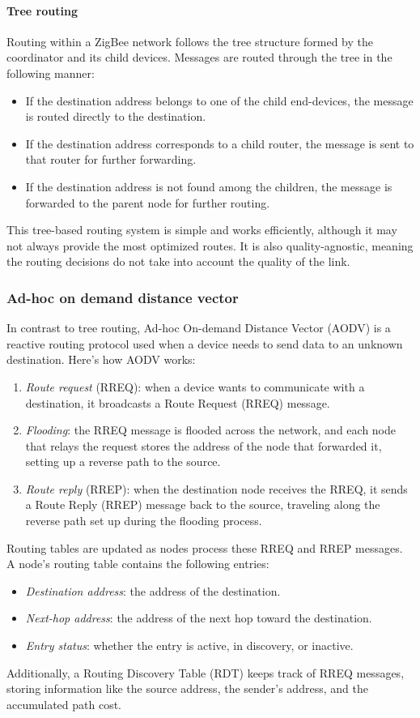 \paragraph*{Tree routing}
Routing within a ZigBee network follows the tree structure formed by the coordinator and its child devices. 
Messages are routed through the tree in the following manner:
\begin{itemize}
    \item If the destination address belongs to one of the child end-devices, the message is routed directly to the destination.
    \item If the destination address corresponds to a child router, the message is sent to that router for further forwarding.
    \item If the destination address is not found among the children, the message is forwarded to the parent node for further routing.
\end{itemize}
This tree-based routing system is simple and works efficiently, although it may not always provide the most optimized routes. 
It is also quality-agnostic, meaning the routing decisions do not take into account the quality of the link.

\subsubsection{Ad-hoc on demand distance vector}
In contrast to tree routing, Ad-hoc On-demand Distance Vector (AODV) is a reactive routing protocol used when a device needs to send data to an unknown destination. 
Here's how AODV works:
\begin{enumerate}
    \item \textit{Route request} (RREQ): when a device wants to communicate with a destination, it broadcasts a Route Request (RREQ) message.
    \item \textit{Flooding}: the RREQ message is flooded across the network, and each node that relays the request stores the address of the node that forwarded it, setting up a reverse path to the source.
    \item \textit{Route reply} (RREP): when the destination node receives the RREQ, it sends a Route Reply (RREP) message back to the source, traveling along the reverse path set up during the flooding process.
\end{enumerate}
\noindent Routing tables are updated as nodes process these RREQ and RREP messages. 
A node's routing table contains the following entries:
\begin{itemize}
    \item \textit{Destination address}: the address of the destination.
    \item \textit{Next-hop address}: the address of the next hop toward the destination.
    \item \textit{Entry status}: whether the entry is active, in discovery, or inactive.
\end{itemize}
\noindent Additionally, a Routing Discovery Table (RDT) keeps track of RREQ messages, storing information like the source address, the sender's address, and the accumulated path cost.

